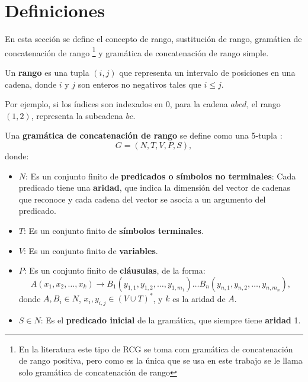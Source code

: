 \section{Definiciones}

En esta sección se define el concepto de rango, sustitución de rango, gramática de concatenación de rango \footnote{En la literatura este tipo de RCG se toma com gramática de concatenación de rango positiva, pero como es la única que
    se usa en este trabajo se le llama solo gramática de concatenación de rango} y gramática de concatenación de rango simple.

\begin{definition}
    Un \textbf{rango} es una tupla $(i, j)$ que representa un intervalo de posiciones en una cadena, donde $i$ y $j$ son enteros no negativos tales que $i \leq j$.    
\end{definition}

Por ejemplo, si los índices son indexados en 0, para la cadena $abcd$, el rango $(1,2)$, representa la subcadena $bc$.

\begin{definition}
    Una \textbf{gramática de concatenación de rango} se define como una 5-tupla
    :
    \[
        G = (N, T, V, P, S),
    \]
    donde:
    
    \begin{itemize}
        \item $N$: Es un conjunto finito de \textbf{predicados o símbolos no terminales}: Cada predicado tiene una \textbf{aridad}, que indica la dimensión del vector de cadenas que reconoce y cada cadena del vector se asocia a un argumento del predicado.
        \item $T$: Es un conjunto finito de \textbf{símbolos terminales}.
        \item $V$: Es un conjunto finito de \textbf{variables}.
        \item $P$: Es un conjunto finito de \textbf{cláusulas}, de la forma:
              \[
                  A(x_1, x_2, \ldots, x_k) \to B_1(y_{1,1}, y_{1,2}, \ldots, y_{1,m_1}) \ldots B_n(y_{n,1}, y_{n,2}, \ldots, y_{n,m_n}),
              \]
              donde $A, B_i \in N$, $x_i, y_{i,j} \in (V \cup T)^*$, y $k$ es la aridad de $A$.
        \item $S \in N$: Es el \textbf{predicado inicial} de la gramática, que siempre tiene \textbf{aridad} 1.
    \end{itemize}
\end{definition}


